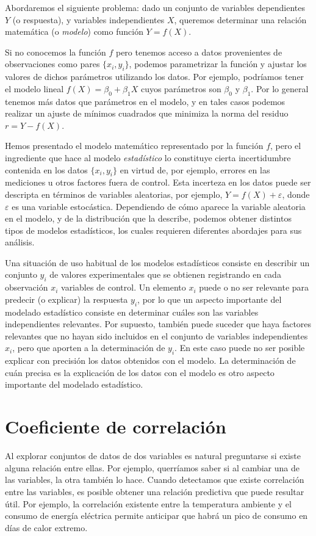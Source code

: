 Abordaremos el siguiente problema: dado un conjunto de variables dependientes $Y$ (o respuesta), y variables independientes $X$, queremos determinar una relación matemática (o \textit{modelo}) como función $Y = f(X)$.

Si no conocemos la función $f$ pero tenemos acceso a datos provenientes de observaciones como pares $\{x_i, y_i\}$, podemos parametrizar la función y ajustar los valores de dichos parámetros utilizando los datos. Por ejemplo, podríamos tener el modelo lineal $f(X) = \beta_0 + \beta_1 X$ cuyos parámetros son $\beta_0$ y $\beta_1$. Por lo general tenemos más datos que parámetros en el modelo, y en tales casos podemos realizar un ajuste de mínimos cuadrados que minimiza la norma del residuo $r = Y - f(X)$.

Hemos presentado el modelo matemático representado por la función $f$, pero el ingrediente que hace al modelo \textit{estadístico} lo constituye cierta incertidumbre contenida en los datos $\{x_i, y_i\}$ en virtud de, por ejemplo, errores en las mediciones u otros factores fuera de control. Esta incerteza en los datos puede ser descripta en términos de variables aleatorias, por ejemplo, $Y = f(X) + \varepsilon$, donde $\varepsilon$ es una variable estocástica. Dependiendo de cómo aparece la variable aleatoria en el modelo, y de la distribución que la describe, podemos obtener distintos tipos de modelos estadísticos, los cuales requieren diferentes abordajes para sus análisis.

Una situación de uso habitual de los modelos estadísticos consiste en describir un conjunto $y_i$ de valores experimentales que se obtienen registrando en cada observación $x_i$ variables de control. Un elemento $x_i$ puede o no ser relevante para predecir (o explicar) la respuesta $y_i$, por lo que un aspecto importante del modelado estadístico consiste en determinar cuáles son las variables independientes relevantes. Por supuesto, también puede suceder que haya factores relevantes que no hayan sido incluidos en el conjunto de variables independientes $x_i$, pero que aporten a la determinación de $y_i$. En este caso puede no ser posible explicar con precisión los datos obtenidos con el modelo. La determinación de cuán precisa es la explicación de los datos con el modelo es otro aspecto importante del modelado estadístico.

\section{Coeficiente de correlación}
Al explorar conjuntos de datos de dos variables es natural preguntarse si existe alguna relación entre ellas. Por ejemplo, querríamos saber si al cambiar una de las variables, la otra también lo hace. Cuando detectamos que existe correlación entre las variables, es posible obtener una relación predictiva que puede resultar útil. Por ejemplo, la correlación existente entre la temperatura ambiente y el consumo de energía eléctrica permite anticipar que habrá un pico de consumo en días de calor extremo.

